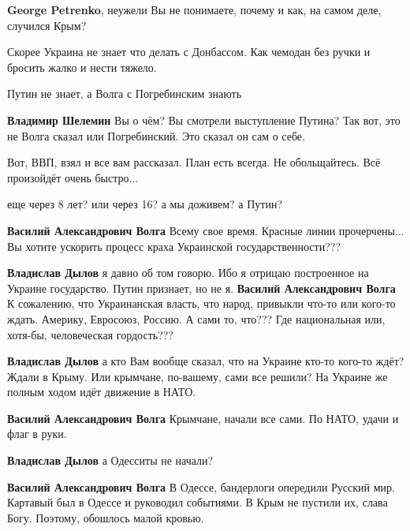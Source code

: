\begin{itemize}
\begin{itemize}
\textbf{George Petrenko}, неужели Вы не понимаете, почему и как, на самом деле, случился Крым?
\end{itemize} %

Скорее Украина не знает что делать с Донбассом. Как чемодан без ручки и бросить жалко и нести тяжело.

Путин не знает, а Волга с Погребинским знають

\begin{itemize} %
\textbf{Владимир Шелемин} Вы о чём? Вы смотрели выступление Путина? Так вот, это не Волга сказал или Погребинский. Это сказал он сам о себе.
\end{itemize} %


Вот, ВВП, взял и все вам рассказал. План есть всегда. Не обольщайтесь. Всё
произойдёт очень быстро...

\begin{itemize} %
еще через 8 лет? или через 16? а мы доживем? а Путин?

\textbf{Василий Александрович Волга} Всему свое время. Красные линии прочерчены... Вы хотите ускорить процесс краха Украинской государственности???

\textbf{Владислав Дылов} я давно об том говорю. Ибо я отрицаю построенное на Украине государство. Путин признает, но не я.
\textbf{Василий Александрович Волга} К сожалению, что Украинанская власть, что народ, привыкли что-то или кого-то ждать. Америку, Евросоюз, Россию. А сами то, что??? Где национальная или, хотя-бы, человеческая гордость???

\textbf{Владислав Дылов} а кто Вам вообще сказал, что на Украине кто-то кого-то ждёт? Ждали в Крыму. Или крымчане, по-вашему, сами все решили?
На Украине же полным ходом идёт движение в НАТО.

\textbf{Василий Александрович Волга} Крымчане, начали все сами. По НАТО, удачи и флаг в руки.

\textbf{Владислав Дылов} а Одесситы не начали?

\textbf{Василий Александрович Волга} В Одессе, бандерлоги опередили Русский мир. Картавый был в Одессе и руководил событиями. В Крым не пустили их, слава Богу. Поэтому, обошлось малой кровью.
\end{itemize} %


\end{itemize}
